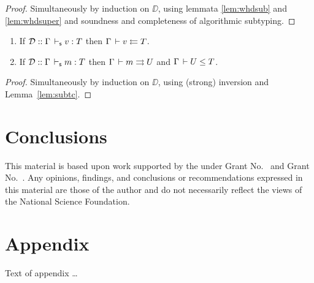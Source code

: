 \documentclass[acmlarge,review,anonymous]{acmart}\settopmatter{printfolios=true}
\begin{document}
\begin{proof}
  Simultaneously by induction on $\DD$, using lemmata \ref{lem:whdsub} and \ref{lem:whdsuper}
  and soundness and completeness of algorithmic subtyping.
\end{proof}
\begin{theorem}
\bla
\begin{enumerate}
\item If $\mathcal{D} :: \Gamma \,\vdash_\mathsf{s} v : T$ then $\Gamma \,\vdash v \leftleftarrows T$.
\item If $\mathcal{D} :: \Gamma \,\vdash_\mathsf{s} m : T$ then $\Gamma \,\vdash m \rightrightarrows U$ and $\Gamma \,\vdash U \leq T$.
\end{enumerate}
\end{theorem}
\begin{proof}
Simultaneously by induction on $\DD$, using (strong) inversion and Lemma~\ref{lem:subtc}.
\end{proof}



\section{Conclusions}
\label{sec:concl}

\begin{acks}                            %
  This material is based upon work supported by the
   under Grant
  No.~ and Grant
  No.~.  Any opinions, findings, and
  conclusions or recommendations expressed in this material are those
  of the author and do not necessarily reflect the views of the
  National Science Foundation.
\end{acks}





\appendix
\section{Appendix}

Text of appendix \ldots
\end{document}
